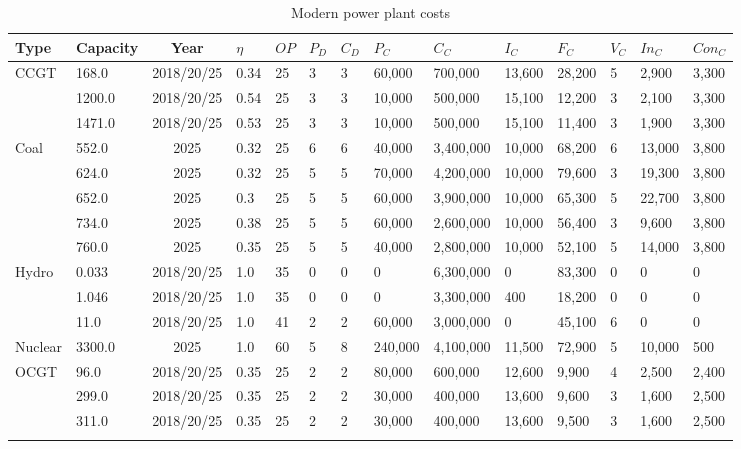 \begin{table*}[]
	\caption{Modern power plant costs \cite{Department2016}}
	\begin{tabularx}{1.0205\linewidth}{|l|l|c|l|l|l|l|l|l|l|l|l|l|l|}
	\hline
	Type & Capacity & Year & $\eta$ & $OP$ & $P_D$ & $C_D$ & $P_C$ & $C_C$ & $I_C$ & $F_C$ & $V_C$ & $In_C$ & $Con_C$ \\ \hline
	\multirow{3}{*}{CCGT} & 168.0 & 2018/20/25 & 0.34 & 25 & 3 & 3 & 60,000 & 700,000 & 13,600 & 28,200 & 5 & 2,900 & 3,300 \\ \cline{2-14} 
	& 1200.0 & 2018/20/25 & 0.54 & 25 & 3 & 3 & 10,000 & 500,000 & 15,100 & 12,200 & 3 & 2,100 & 3,300 \\ \cline{2-14} 
	& 1471.0 & 2018/20/25 & 0.53 & 25 & 3 & 3 & 10,000 & 500,000 & 15,100 & 11,400 & 3 & 1,900 & 3,300 \\ \hline
	\multirow{5}{*}{Coal} & 552.0 & 2025 & 0.32 & 25 & 6 & 6 & 40,000 & 3,400,000 & 10,000 & 68,200 & 6 & 13,000 & 3,800 \\ \cline{2-14} 
	& 624.0 & 2025 & 0.32 & 25 & 5 & 5 & 70,000 & 4,200,000 & 10,000 & 79,600 & 3 & 19,300 & 3,800 \\ \cline{2-14} 
	& 652.0 & 2025 & 0.3 & 25 & 5 & 5 & 60,000 & 3,900,000 & 10,000 & 65,300 & 5 & 22,700 & 3,800 \\ \cline{2-14} 
	& 734.0 & 2025 & 0.38 & 25 & 5 & 5 & 60,000 & 2,600,000 & 10,000 & 56,400 & 3 & 9,600 & 3,800 \\ \cline{2-14} 
	& 760.0 & 2025 & 0.35 & 25 & 5 & 5 & 40,000 & 2,800,000 & 10,000 & 52,100 & 5 & 14,000 & 3,800 \\ \hline
	\multirow{3}{*}{Hydro} & 0.033 & 2018/20/25 & 1.0 & 35 & 0 & 0 & 0 & 6,300,000 & 0 & 83,300 & 0 & 0 & 0 \\ \cline{2-14} 
	& 1.046 & 2018/20/25 & 1.0 & 35 & 0 & 0 & 0 & 3,300,000 & 400 & 18,200 & 0 & 0 & 0 \\ \cline{2-14} 
	& 11.0 & 2018/20/25 & 1.0 & 41 & 2 & 2 & 60,000 & 3,000,000 & 0 & 45,100 & 6 & 0 & 0 \\ \hline
	Nuclear & 3300.0 & 2025 & 1.0 & 60 & 5 & 8 & 240,000 & 4,100,000 & 11,500 & 72,900 & 5 & 10,000 & 500 \\ \hline
	\multirow{5}{*}{OCGT} & 96.0 & 2018/20/25 & 0.35 & 25 & 2 & 2 & 80,000 & 600,000 & 12,600 & 9,900 & 4 & 2,500 & 2,400 \\ \cline{2-14} 
	& 299.0 & 2018/20/25 & 0.35 & 25 & 2 & 2 & 30,000 & 400,000 & 13,600 & 9,600 & 3 & 1,600 & 2,500 \\ \cline{2-14} 
	& 311.0 & 2018/20/25 & 0.35 & 25 & 2 & 2 & 30,000 & 400,000 & 13,600 & 9,500 & 3 & 1,600 & 2,500 \\ \cline{2-14} 

\end{tabularx}
\end{table*}
